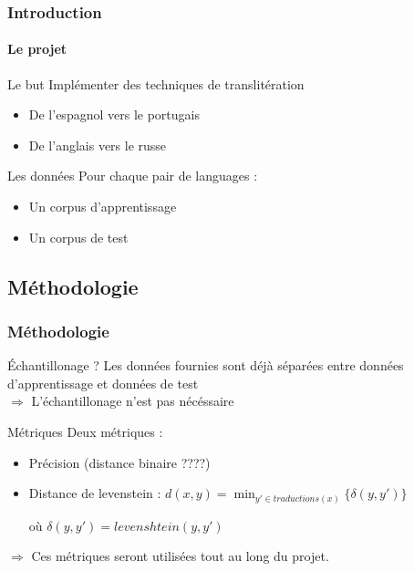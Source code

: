 \documentclass{beamer}
\begin{document}
\begin{frame}
\frametitle{Introduction}
\framesubtitle{Le projet}

	\begin{block}{Le but}
		Implémenter des techniques de translitération 
		\begin{itemize}
		\item De l'espagnol vers le portugais
		\item De l'anglais vers le russe
		\end{itemize}
	\end{block}

	\begin{block}{Les données}
	Pour chaque pair de languages :		
		\begin{itemize}
		\item Un corpus d'apprentissage
		\item Un corpus de test
		\end{itemize}		
	\end{block}

\end{frame}


\subsection{Méthodologie}

\begin{frame}
\frametitle{Méthodologie}

	\begin{block}{Échantillonage ?}
	Les données fournies sont déjà séparées entre données d'apprentissage et données de test\\
	$\Longrightarrow$ L'échantillonage n'est pas nécéssaire
	\end{block}

	\begin{block}{Métriques}
	Deux métriques  :
		\begin{itemize}
		\item Précision (distance binaire ????)
		\item Distance de levenstein : $d(x,y) = \min_{y' \in traductions(x)} \{\delta(y,y')\}$

où $\delta(y,y')=levenshtein(y,y')$
		\end{itemize}		
	\end{block}
	
	\begin{alertblock}{}
	$\Longrightarrow$ Ces métriques seront utilisées tout au long du projet.
	\end{alertblock}	
	
\end{frame}
\end{document}

